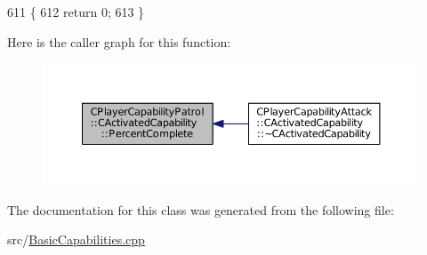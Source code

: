 \begin{DoxyCode}
611                                                                        \{
612     \textcolor{keywordflow}{return} 0;
613 \}
\end{DoxyCode}
Here is the caller graph for this function\+:\nopagebreak
\begin{figure}[H]
\begin{center}
\leavevmode
\includegraphics[width=350pt]{classCPlayerCapabilityPatrol_1_1CActivatedCapability_a868e6583a55b01e5aa3b926ef14677bc_icgraph}
\end{center}
\end{figure}


The documentation for this class was generated from the following file\+:\begin{DoxyCompactItemize}
\item 
src/\hyperlink{BasicCapabilities_8cpp}{Basic\+Capabilities.\+cpp}\end{DoxyCompactItemize}
